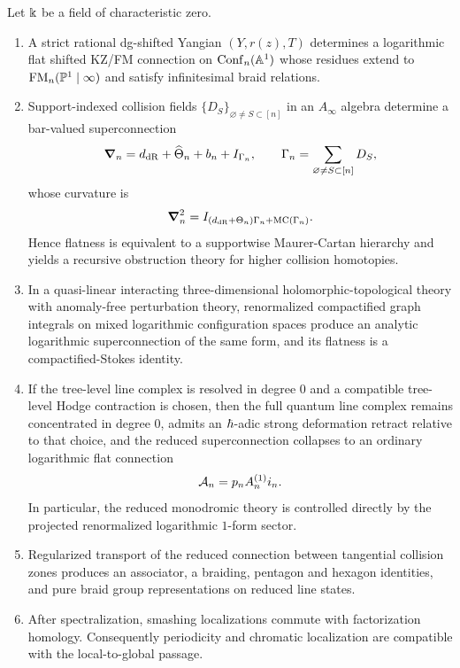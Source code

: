 \begin{theorem}\label{thm:synthesis}
Let $\Bbbk$ be a field of characteristic zero.
\begin{enumerate}[label=\textup{(\roman*)}]
 \item A strict rational dg-shifted Yangian $(Y,r(z),T)$ determines a logarithmic flat shifted KZ/FM connection on $\mathrm{Conf}_n(\mathbb A^1)$ whose residues extend to $\mathrm{FM}_n(\mathbb P^1\mid\infty)$ and satisfy infinitesimal braid relations.
 \item Support-indexed collision fields $\{D_S\}_{\varnothing\neq S\subset[n]}$ in an $A_\infty$ algebra determine a bar-valued superconnection
 \[
 \boldsymbol{\nabla}_n=d_{\mathrm{dR}}+\widehat\Theta_n+b_n+I_{\Gamma_n},\qquad \Gamma_n=\sum_{\varnothing\neq S\subset[n]}D_S,
 \]
 whose curvature is
 \[
 \boldsymbol{\nabla}_n^2 = I_{(d_{\mathrm{dR}}+\Theta_n)\Gamma_n+\mathrm{MC}(\Gamma_n)}.
 \]
 Hence flatness is equivalent to a supportwise Maurer-Cartan hierarchy and yields a recursive obstruction theory for higher collision homotopies.
 \item In a quasi-linear interacting three-dimensional holomorphic-topological theory with anomaly-free perturbation theory, renormalized compactified graph integrals on mixed logarithmic configuration spaces produce an analytic logarithmic superconnection of the same form, and its flatness is a compactified-Stokes identity.
 \item If the tree-level line complex is resolved in degree $0$ and a compatible tree-level Hodge contraction is chosen, then the full quantum line complex remains concentrated in degree $0$, admits an $\hbar$-adic strong deformation retract relative to that choice, and the reduced superconnection collapses to an ordinary logarithmic flat connection
 \[
 \mathcal A_n = p_n A_n^{(1)} i_n.
 \]
 In particular, the reduced monodromic theory is controlled directly by the projected renormalized logarithmic $1$-form sector.
 \item Regularized transport of the reduced connection between tangential collision zones produces an associator, a braiding, pentagon and hexagon identities, and pure braid group representations on reduced line states.
 \item After spectralization, smashing localizations commute with factorization homology. Consequently periodicity and chromatic localization are compatible with the local-to-global passage.
\end{enumerate}
\end{theorem}

